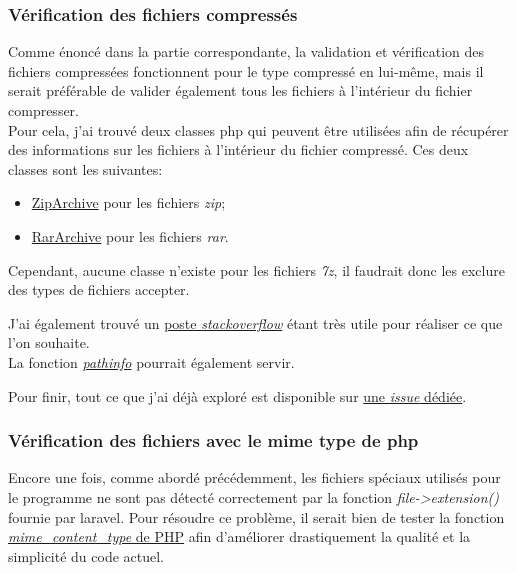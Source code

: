 \documentclass[
    iai, %
    il, %
]{heig-tb}
\begin{document}
\subsubsection{Vérification des fichiers compressés}
Comme énoncé dans la partie correspondante, la validation et vérification des fichiers compressées fonctionnent pour le type compressé en lui-même, mais il serait préférable de valider également tous les fichiers à l'intérieur du fichier compresser. \\
Pour cela, j'ai trouvé deux classes \Gls{php} qui peuvent être utilisées afin de récupérer des informations sur les fichiers à l'intérieur du fichier compressé. Ces deux classes sont les suivantes:
\begin{itemize}
    \item \href{https://www.php.net/manual/fr/class.ziparchive.php}{ZipArchive} pour les fichiers \emph{zip};
    \item \href{https://www.php.net/manual/en/class.rararchive.php}{RarArchive} pour les fichiers \emph{rar}.
\end{itemize}

Cependant, aucune classe n'existe pour les fichiers \emph{7z}, il faudrait donc les exclure des types de fichiers accepter.

J'ai également trouvé un \href{https://stackoverflow.com/questions/25847374/ziparchive-check-file-extension}{poste \emph{stackoverflow}} étant très utile pour réaliser ce que l'on souhaite. \\
La fonction \href{https://www.php.net/manual/fr/function.pathinfo.php}{\emph{pathinfo}} pourrait également servir.

Pour finir, tout ce que j'ai déjà exploré est disponible sur \href{https://github.com/heig-fablab/fablab-manager/issues/139}{une \emph{issue} dédiée}.

\subsubsection{Vérification des fichiers avec le mime type de php}
Encore une fois, comme abordé précédemment, les fichiers spéciaux utilisés pour le programme ne sont pas détecté correctement par la fonction \emph{file->extension()} fournie par \Gls{laravel}.
Pour résoudre ce problème, il serait bien de tester la fonction \href{https://www.php.net/manual/fr/function.mime-content-type.php}{\emph{mime\_content\_type} de PHP} afin d'améliorer drastiquement la qualité et la simplicité du code actuel.
\end{document}
